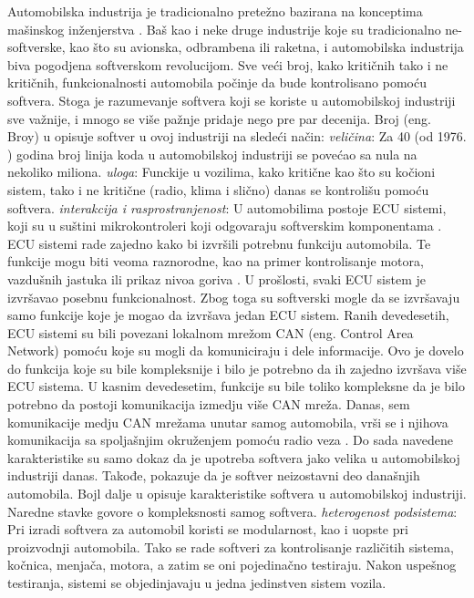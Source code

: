 \documentclass[a4paper]{article}
\begin{document}
Automobilska industrija je tradicionalno pretežno bazirana na konceptima mašinskog inženjerstva \cite{ref5}\cite{ref6}. Baš kao i neke druge industrije koje su tradicionalno ne-softverske, kao što su avionska, odbrambena ili raketna, i automobilska industrija biva pogodjena softverskom revolucijom. Sve veći broj, kako kritičnih tako i ne kritičnih, funkcionalnosti automobila počinje da bude kontrolisano pomoću softvera. Stoga je razumevanje softvera koji se koriste u automobilskoj industriji sve važnije, i mnogo se više pažnje pridaje nego pre par decenija. Broj (eng. Broy) u \cite{ref6} opisuje softver u ovoj industriji na sledeći način:
\bigbreak
\textit{veličina}: Za 40 (od 1976. \cite{ref7}) godina broj linija koda u automobilskoj industriji se povećao sa nula na nekoliko miliona.
\bigbreak
\textit{uloga}: Funckije u vozilima, kako kritične kao što su kočioni sistem, tako i ne kritične (radio, klima i slično) danas se kontrolišu pomoću softvera. 
\bigbreak
\textit{interakcija i rasprostranjenost}: U automobilima postoje ECU sistemi, koji su u suštini mikrokontroleri koji odgovaraju softverskim komponentama \cite{ref38}. ECU sistemi rade zajedno kako bi izvršili potrebnu funkciju automobila. Te funkcije mogu biti veoma raznorodne, kao na primer kontrolisanje motora, vazdušnih jastuka ili prikaz nivoa goriva \cite{ref8}. U prošlosti, svaki ECU sistem je izvršavao posebnu funkcionalnost. Zbog toga su softverski mogle da se izvršavaju samo funkcije koje je mogao da izvršava jedan ECU sistem. Ranih devedesetih, ECU sistemi su bili povezani lokalnom mrežom CAN (eng. Control Area Network) pomoću koje su mogli da komuniciraju i dele informacije. Ovo je dovelo do funkcija koje su bile kompleksnije i bilo je potrebno da ih zajedno izvršava više ECU sistema. U kasnim devedesetim, funkcije su bile toliko kompleksne da je bilo potrebno da postoji komunikacija izmedju više CAN mreža. Danas, sem komunikacije medju CAN mrežama unutar samog automobila, vrši se i njihova komunikacija sa spoljašnjim okruženjem pomoću radio veza \cite{ref2}.
\bigbreak
Do sada navedene karakteristike su samo dokaz da je upotreba softvera jako velika u automobilskoj industriji danas. Takođe, pokazuje da je softver neizostavni deo današnjih automobila. Bojl dalje u \cite{ref7} opisuje karakteristike softvera u automobilskoj industriji. Naredne stavke govore o kompleksnosti samog softvera.
\bigbreak
\textit{heterogenost podsistema}: Pri izradi softvera za automobil koristi se modularnost, kao i uopste pri proizvodnji automobila. Tako se rade softveri za kontrolisanje različitih sistema, kočnica, menjača, motora, a zatim se oni pojedinačno testiraju. Nakon uspešnog testiranja, sistemi se objedinjavaju u jedna jedinstven sistem vozila. 
\end{document}
